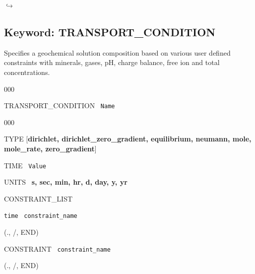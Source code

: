 \documentclass[12pt]{article}
\newcommand\return{{\hfill$\hookrightarrow$}}
\begin{document}
\hyperlink{target_key}{\return}


\newpage
\protect\hypertarget{target_trans_cond}{}

\subsection{Keyword: TRANSPORT\_CONDITION}

 Specifies a geochemical solution composition based on various user defined constraints with minerals, gases, pH, charge balance, free ion and total concentrations.

\begin{deflist}{000}
\item[TRANSPORT\_CONDITION] \ {\tt Name}

\begin{deflist}{000}
\item[TYPE] [{\bf dirichlet, dirichlet\_zero\_gradient, equilibrium, neumann, mole, mole\_rate, \linebreak zero\_gradient}]
\item[TIME] \ {\tt Value}
\item[UNITS] \ {\bf s, sec, min, hr, d, day, y, yr}
\item[CONSTRAINT\_LIST]
\item {\tt time} \ {\tt constraint\_name}
\item[(., /, END)]
\item[CONSTRAINT] \ {\tt constraint\_name}
\end{deflist}
\item[(., /, END)]
\end{deflist}


\end{document}
